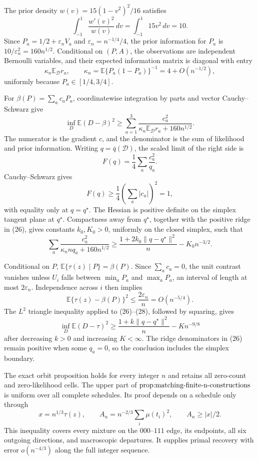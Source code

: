 The prior density \(w(v)=15(1-v^2)^2/16\) satisfies
\[
\int_{-1}^1\frac{w'(v)^2}{w(v)}\,dv
=\int_{-1}^1 15v^2\,dv=10.
\]
Since \(P_a=1/2+\varepsilon_nV_a\) and \(\varepsilon_n=n^{-1/4}/4\), the prior information for \(P_a\) is \(10/\varepsilon_n^2=160n^{1/2}\).  Conditional on \((P,A)\), the observations are independent Bernoulli variables, and their expected information matrix is diagonal with entry
\[
\kappa_n\mathbb E_{\mathcal D}r_a,
\qquad
\kappa_n=\mathbb E\{P_a(1-P_a)\}^{-1}=4+O(n^{-1/2}),
\]
uniformly because \(P_a\in[1/4,3/4]\).

For \(\beta(P)=\sum_ac_aP_a\), coordinatewise integration by parts and vector Cauchy--Schwarz give
\[
\inf_D\mathbb E(D-\beta)^2
\geq\sum_{a=1}^3
\frac{c_a^2}{\kappa_n\mathbb E_{\mathcal D}r_a+160n^{1/2}}.
\tag{26}
\]
The numerator is the gradient \(c\), and the denominator is the sum of likelihood and prior information.  Writing \(q=\bar q(\mathcal D)\), the scaled limit of the right side is
\[
F(q)=\frac14\sum_a\frac{c_a^2}{q_a}.
\]
Cauchy--Schwarz gives
\[
F(q)\geq\frac14\left(\sum_a|c_a|\right)^2=1,
\]
with equality only at \(q=q^\star\).  The Hessian is positive definite on the simplex tangent plane at \(q^\star\).  Compactness away from \(q^\star\), together with the positive ridge in (26), gives constants \(k_0,K_0>0\), uniformly on the closed simplex, such that
\[
\sum_a\frac{c_a^2}{\kappa_n n q_a+160n^{1/2}}
\geq\frac{1+2k_0\|q-q^\star\|^2}{n}-K_0n^{-3/2}.
\tag{27}
\]

Conditional on \(P\), \(\mathbb E\{\tau(z)\mid P\}=\beta(P)\).  Since \(\sum_ac_a=0\), the unit contrast vanishes unless \(U_i\) falls between \(\min_aP_a\) and \(\max_aP_a\), an interval of length at most \(2\varepsilon_n\).  Independence across \(i\) then implies
\[
\mathbb E\{\tau(z)-\beta(P)\}^2
\leq\frac{2\varepsilon_n}{n}=O(n^{-5/4}).
\tag{28}
\]
The \(L^2\) triangle inequality applied to (26)--(28), followed by squaring, gives
\[
\inf_D\mathbb E(D-\tau)^2
\geq\frac{1+k\|q-q^\star\|^2}{n}-Kn^{-9/8}
\]
after decreasing \(k>0\) and increasing \(K<\infty\).  The ridge denominators in (26) remain positive when some \(q_a=0\), so the conclusion includes the simplex boundary.

The exact orbit proposition holds for every integer \(n\) and retains all zero-count and zero-likelihood cells.  The upper part of \(\textnormal{prop:matching-finite-n-constructions}\) is uniform over all complete schedules.  Its proof depends on a schedule only through
\[
x=n^{1/3}\tau(z),
\qquad
A_n=n^{-2/3}\sum_i\mu(t_i)^2,
\qquad
A_n\geq |x|/2.
\]
This inequality covers every mixture on the \(000\)--\(111\) edge, its endpoints, all six outgoing directions, and macroscopic departures.  It supplies primal recovery with error \(o(n^{-4/3})\) along the full integer sequence.

